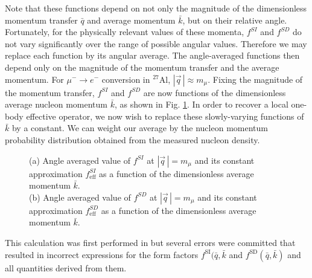 \documentclass[12pt,letterpaper]{book}
\begin{document}
Note that these functions depend on not only the magnitude of the dimensionless momentum transfer $\bar{q}$ and average momentum $\bar{k}$, but on their relative angle. Fortunately, for the physically relevant values of these momenta, $f^{SI}$ and $f^{SD}$ do not vary significantly over the range of possible angular values. Therefore we may replace each function by its angular average. The angle-averaged functions then depend only on the magnitude of the momentum transfer and the average momentum. For $\mu^-\rightarrow e^-$ conversion in $^{27}$Al, $|\vec{q}\,|\approx m_{\mu}$. Fixing the magnitude of the momentum transfer, $f^{SI}$ and $f^{SD}$ are now functions of the dimensionless average nucleon momentum $\bar{k}$, as shown in Fig. \ref{fig:1body_f_functions}. In order to recover a local one-body effective operator, we now wish to replace these slowly-varying functions of $\bar{k}$ by a constant. We can weight our average by the nucleon momentum probability distribution obtained from the measured nucleon density.
\begin{figure}
\centering
{}
\hfill
{}
\caption{(a) Angle averaged value of $f^{SI}$ at $|\vec{q}\,|=m_{\mu}$ and its constant approximation $f_\mathrm{eff}^{SI}$ as a function of the dimensionless average momentum $\bar{k}$. 
\\
(b) Angle averaged value of $f^{SD}$ at $|\vec{q}\,|=m_{\mu}$ and its constant approximation $f_\mathrm{eff}^{SD}$ as a function of the dimensionless average momentum $\bar{k}$.}
\label{fig:1body_f_functions}
\end{figure}

This calculation was first performed in \cite{2018PhRvC..98a5208B} but several errors were committed that resulted in incorrect expressions for the form factors $f^\mathrm{SI}(\bar{q},\bar{k}$ and $f^\mathrm{SD}(\bar{q},\bar{k})$ and all quantities derived from them.
\end{document}

